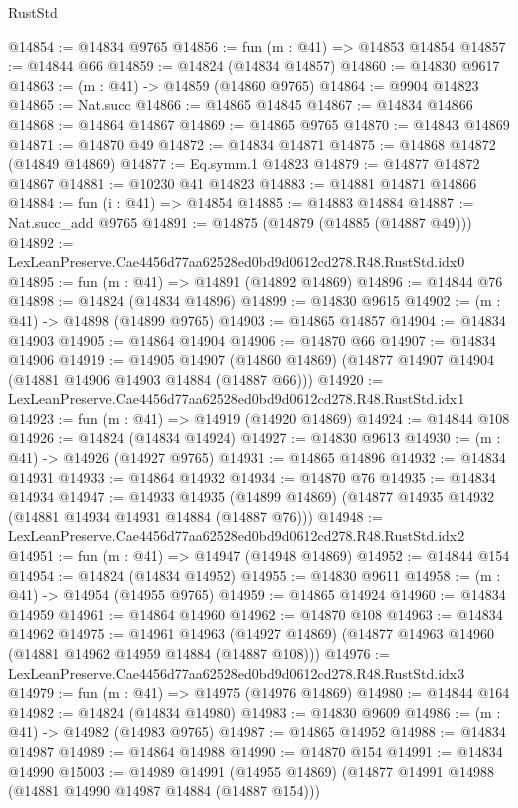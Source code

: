 \begin{lexlean}{RustStd}
\begin{coremodule}
@14854 := @14834 @9765
@14856 := fun (m : @41) => @14853 @14854
@14857 := @14844 @66
@14859 := @14824 (@14834 @14857)
@14860 := @14830 @9617
@14863 := (m : @41) -> @14859 (@14860 @9765)
@14864 := @9904 @14823
@14865 := Nat.succ
@14866 := @14865 @14845
@14867 := @14834 @14866
@14868 := @14864 @14867
@14869 := @14865 @9765
@14870 := @14843 @14869
@14871 := @14870 @49
@14872 := @14834 @14871
@14875 := @14868 @14872 (@14849 @14869)
@14877 := Eq.symm.{1} @14823
@14879 := @14877 @14872 @14867
@14881 := @10230 @41 @14823
@14883 := @14881 @14871 @14866
@14884 := fun (i : @41) => @14854
@14885 := @14883 @14884
@14887 := Nat.succ_add @9765
@14891 := @14875 (@14879 (@14885 (@14887 @49)))
@14892 := LexLeanPreserve.Cae4456d77aa62528ed0bd9d0612cd278.R48.RustStd.idx0
@14895 := fun (m : @41) => @14891 (@14892 @14869)
@14896 := @14844 @76
@14898 := @14824 (@14834 @14896)
@14899 := @14830 @9615
@14902 := (m : @41) -> @14898 (@14899 @9765)
@14903 := @14865 @14857
@14904 := @14834 @14903
@14905 := @14864 @14904
@14906 := @14870 @66
@14907 := @14834 @14906
@14919 := @14905
    @14907
    (@14860 @14869)
    (@14877 @14907 @14904 (@14881 @14906 @14903 @14884 (@14887 @66)))
@14920 := LexLeanPreserve.Cae4456d77aa62528ed0bd9d0612cd278.R48.RustStd.idx1
@14923 := fun (m : @41) => @14919 (@14920 @14869)
@14924 := @14844 @108
@14926 := @14824 (@14834 @14924)
@14927 := @14830 @9613
@14930 := (m : @41) -> @14926 (@14927 @9765)
@14931 := @14865 @14896
@14932 := @14834 @14931
@14933 := @14864 @14932
@14934 := @14870 @76
@14935 := @14834 @14934
@14947 := @14933
    @14935
    (@14899 @14869)
    (@14877 @14935 @14932 (@14881 @14934 @14931 @14884 (@14887 @76)))
@14948 := LexLeanPreserve.Cae4456d77aa62528ed0bd9d0612cd278.R48.RustStd.idx2
@14951 := fun (m : @41) => @14947 (@14948 @14869)
@14952 := @14844 @154
@14954 := @14824 (@14834 @14952)
@14955 := @14830 @9611
@14958 := (m : @41) -> @14954 (@14955 @9765)
@14959 := @14865 @14924
@14960 := @14834 @14959
@14961 := @14864 @14960
@14962 := @14870 @108
@14963 := @14834 @14962
@14975 := @14961
    @14963
    (@14927 @14869)
    (@14877 @14963 @14960 (@14881 @14962 @14959 @14884 (@14887 @108)))
@14976 := LexLeanPreserve.Cae4456d77aa62528ed0bd9d0612cd278.R48.RustStd.idx3
@14979 := fun (m : @41) => @14975 (@14976 @14869)
@14980 := @14844 @164
@14982 := @14824 (@14834 @14980)
@14983 := @14830 @9609
@14986 := (m : @41) -> @14982 (@14983 @9765)
@14987 := @14865 @14952
@14988 := @14834 @14987
@14989 := @14864 @14988
@14990 := @14870 @154
@14991 := @14834 @14990
@15003 := @14989
    @14991
    (@14955 @14869)
    (@14877 @14991 @14988 (@14881 @14990 @14987 @14884 (@14887 @154)))

\end{coremodule}
\end{lexlean}
